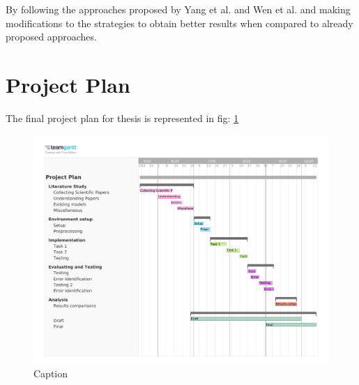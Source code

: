 \documentclass[a4paper]{article}
\begin{document}
By following the approaches proposed by Yang et al. and Wen et al. and making modifications to the strategies to obtain better results when compared to already proposed approaches. 


\section{Project Plan}

The final project plan for thesis is represented in fig: \ref{fig:plan}
\begin{figure}[h]
    \centering
    \includegraphics[width=1.0\textwidth]{plan.pdf}
    \caption{Caption}
    \label{fig:plan}
\end{figure}

\newpage


\end{document}
